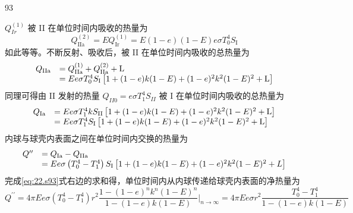 \begin{solution}{93}
\begin{subsolution}
\begin{equation}
\label{eq:18.s93}
\end{equation}
$Q_{Ir}^{(1)}$ 被 II 在单位时间内吸收的热量为
\begin{equation}
Q _ {\mathrm{IIa}} ^ {(2)} = E Q _ {\mathrm{Ir}} ^ {(1)} = E (1 - e) (1 - E) e \sigma T _ {0} ^ {4} S _ {\mathrm{I}}
\label{eq:19.s93}
\end{equation}
如此等等。不断反射、吸收后，被 II 在单位时间内吸收的总热量为
\begin{equation}
\begin{array}{r l} Q _ {\mathrm{IIa}} & = Q _ {\mathrm{IIa}} ^ {(1)} + Q _ {\mathrm{IIa}} ^ {(2)} + \mathrm{L} \\ & = E e \sigma T _ {0} ^ {4} S _ {\mathrm{I}} \left[ 1 + (1 - e) k (1 - E) + (1 - e) ^ {2} k ^ {2} (1 - E) ^ {2} + \mathrm{L} \right] \end{array}
\label{eq:20.s93}
\end{equation}
同理可得由 II 发射的热量 $Q_{II0}=e\sigma T_{1}^{4}S_{II}$ 被 I 在单位时间内吸收的总热量为
\begin{equation}
\begin{array}{r l} Q _ {\mathrm{Ia}} & = E e \sigma T _ {1} ^ {4} k S _ {\mathrm{II}} \left[ 1 + (1 - e) k (1 - E) + (1 - e) ^ {2} k ^ {2} (1 - E) ^ {2} + \mathrm{L} \right] \\ & = E e \sigma T _ {1} ^ {4} S _ {\mathrm{I}} \left[ 1 + (1 - e) k (1 - E) + (1 - e) ^ {2} k ^ {2} (1 - E) ^ {2} + \mathrm{L} \right] \end{array}
\label{eq:21.s93}
\end{equation}
内球与球壳内表面之间在单位时间内交换的热量为
\begin{equation}
\begin{array}{r l} Q ^ {\prime \prime} & = Q _ {\mathrm{Ia}} - Q _ {\mathrm{IIa}} \\ & = E e \sigma \left(T _ {0} ^ {4} - T _ {1} ^ {4}\right) S _ {\mathrm{I}} \left[ 1 + (1 - e) k (1 - E) + (1 - e) ^ {2} k ^ {2} (1 - E) ^ {2} + L \right] \end{array}
\label{eq:22.s93}
\end{equation}
完成\eqref{eq:22.s93}式右边的求和得，单位时间内从内球传递给球壳内表面的净热量为
\begin{equation}
Q ^ {\prime \prime} = 4 \pi E e \sigma \left(T _ {0} ^ {4} - T _ {1} ^ {4}\right) r ^ {2} \frac {1 - (1 - e) ^ {n} k ^ {n} (1 - E) ^ {n}}{1 - (1 - e) k (1 - E)} \Bigg | _ {n \rightarrow \infty} = 4 \pi E e \sigma r ^ {2} \frac {T _ {0} ^ {4} - T _ {1} ^ {4}}{1 - (1 - e) k (1 - E)}
\label{eq:23.s93}
\end{equation}

\end{subsolution}
\end{solution}
